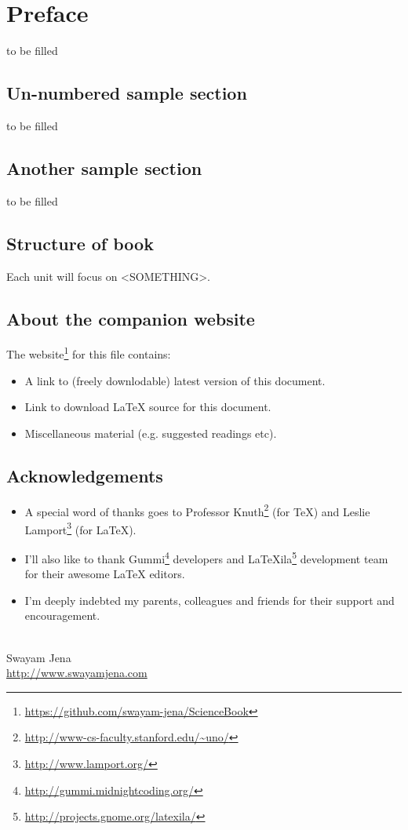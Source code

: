 \chapter*{Preface}
to be filled

\section*{Un-numbered sample section}
to be filled

\section*{Another sample section}
to be filled

\section*{Structure of book}
Each unit will focus on <SOMETHING>.

\section*{About the companion website}
The website\footnote{\url{https://github.com/swayam-jena/ScienceBook}} for this file contains:
\begin{itemize}
  \item A link to (freely downlodable) latest version of this document.
  \item Link to download LaTeX source for this document.
  \item Miscellaneous material (e.g. suggested readings etc).
\end{itemize}

\section*{Acknowledgements}
\begin{itemize}
\item A special word of thanks goes to Professor Knuth\footnote{\url{http://www-cs-faculty.stanford.edu/~uno/}} (for \TeX{}) and Leslie Lamport\footnote{\url{http://www.lamport.org/}} (for \LaTeX{}).
\item I'll also like to thank Gummi\footnote{\url{http://gummi.midnightcoding.org/}} developers and LaTeXila\footnote{\url{http://projects.gnome.org/latexila/}} development team for their awesome \LaTeX{} editors.
\item I'm deeply indebted my parents, colleagues and friends for their support and encouragement.
\end{itemize}
\mbox{}\\
\noindent Swayam Jena \\
\noindent \url{http://www.swayamjena.com}
